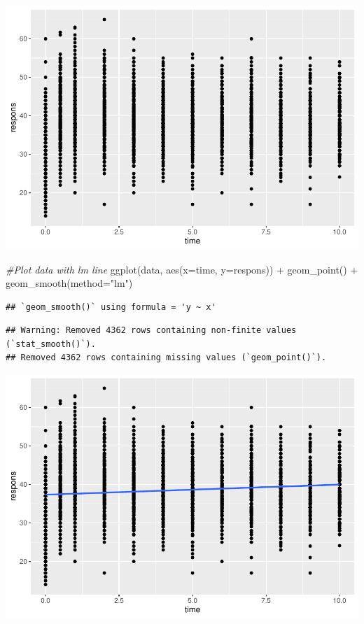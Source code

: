 \documentclass[
]{article}
\newenvironment{Shaded}{\begin{snugshade}}{\end{snugshade}}
\newcommand{\AttributeTok}[1]{\textcolor[rgb]{0.77,0.63,0.00}{#1}}
\newcommand{\CommentTok}[1]{\textcolor[rgb]{0.56,0.35,0.01}{\textit{#1}}}
\newcommand{\FunctionTok}[1]{\textcolor[rgb]{0.00,0.00,0.00}{#1}}
\newcommand{\NormalTok}[1]{#1}
\newcommand{\SpecialCharTok}[1]{\textcolor[rgb]{0.00,0.00,0.00}{#1}}
\newcommand{\StringTok}[1]{\textcolor[rgb]{0.31,0.60,0.02}{#1}}
\begin{document}
\includegraphics{LDA_Wan_files/figure-latex/unnamed-chunk-8-1.pdf}

\begin{Shaded}
\begin{Highlighting}[]
\CommentTok{\#Plot data with lm line}
\FunctionTok{ggplot}\NormalTok{(data, }\FunctionTok{aes}\NormalTok{(}\AttributeTok{x=}\NormalTok{time, }\AttributeTok{y=}\NormalTok{respons)) }\SpecialCharTok{+} \FunctionTok{geom\_point}\NormalTok{() }\SpecialCharTok{+} \FunctionTok{geom\_smooth}\NormalTok{(}\AttributeTok{method=}\StringTok{"lm"}\NormalTok{)}
\end{Highlighting}
\end{Shaded}

\begin{verbatim}
## `geom_smooth()` using formula = 'y ~ x'
\end{verbatim}

\begin{verbatim}
## Warning: Removed 4362 rows containing non-finite values (`stat_smooth()`).
## Removed 4362 rows containing missing values (`geom_point()`).
\end{verbatim}

\includegraphics{LDA_Wan_files/figure-latex/unnamed-chunk-8-2.pdf}
\end{document}
